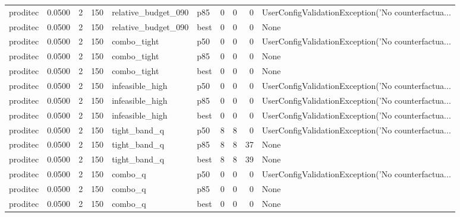 \begin{tabular}{lrrrllrrrl}
proditec &    0.0500 &    2 &    150 &  relative\_budget\_090 &    p85 &               0 &          0 &       0 & UserConfigValidationException('No counterfactua... \\
proditec &    0.0500 &    2 &    150 &  relative\_budget\_090 &   best &               0 &          0 &       0 &                                               None \\
proditec &    0.0500 &    2 &    150 &          combo\_tight &    p50 &               0 &          0 &       0 & UserConfigValidationException('No counterfactua... \\
proditec &    0.0500 &    2 &    150 &          combo\_tight &    p85 &               0 &          0 &       0 &                                               None \\
proditec &    0.0500 &    2 &    150 &          combo\_tight &   best &               0 &          0 &       0 &                                               None \\
proditec &    0.0500 &    2 &    150 &      infeasible\_high &    p50 &               0 &          0 &       0 & UserConfigValidationException('No counterfactua... \\
proditec &    0.0500 &    2 &    150 &      infeasible\_high &    p85 &               0 &          0 &       0 & UserConfigValidationException('No counterfactua... \\
proditec &    0.0500 &    2 &    150 &      infeasible\_high &   best &               0 &          0 &       0 & UserConfigValidationException('No counterfactua... \\
proditec &    0.0500 &    2 &    150 &         tight\_band\_q &    p50 &               8 &          8 &       0 & UserConfigValidationException('No counterfactua... \\
proditec &    0.0500 &    2 &    150 &         tight\_band\_q &    p85 &               8 &          8 &      37 &                                               None \\
proditec &    0.0500 &    2 &    150 &         tight\_band\_q &   best &               8 &          8 &      39 &                                               None \\
proditec &    0.0500 &    2 &    150 &              combo\_q &    p50 &               0 &          0 &       0 & UserConfigValidationException('No counterfactua... \\
proditec &    0.0500 &    2 &    150 &              combo\_q &    p85 &               0 &          0 &       0 &                                               None \\
proditec &    0.0500 &    2 &    150 &              combo\_q &   best &               0 &          0 &       0 &                                               None \\
\bottomrule
\end{tabular}
